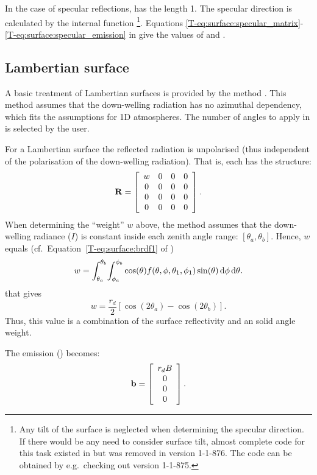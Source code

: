 In the case of specular reflections,  has the length 1.
The specular direction is calculated by the internal function
\footnote{Any tilt of the surface is
  neglected when determining the specular direction. If there would be any need
  to consider surface tilt, almost complete code for this task existed in
   but was removed in version 1-1-876. The
  code can be obtained by e.g.\ checking out version 1-1-875.}. Equations
\ref{T-eq:surface:specular_matrix}-\ref{T-eq:surface:specular_emission}
in \theory give the values of  and
.



\subsection{Lambertian surface}
A basic treatment of Lambertian surfaces is provided by the method
. This method assumes that the down-welling
radiation has no azimuthal dependency, which fits the assumptions for 1D
atmospheres. The number of angles to apply in  is
selected by the user. 

For a Lambertian surface the reflected radiation is unpolarised (thus
independent of the polarisation of the down-welling radiation). That is,
each  has the structure:
\begin{equation}
  \mathbf{R} =
     \left[\begin{array}{cccc}
       w&0&0&0\\
       0&0&0&0\\
       0&0&0&0\\
       0&0&0&0\\
     \end{array}
     \right].
\end{equation}
When determining the ``weight'' $w$ above, the method assumes that the
down-welling radiance ($I$) is constant inside each zenith angle range:
$[\theta_a,\theta_b]$. Hence, $w$ equals (cf.\
Equation~\ref{T-eq:surface:brdf1} of \theory)
\begin{equation}
  \label{eq:surface:brdf2}
  w = \int_{\theta_a}^{\theta_b} \! \int_{\phi_a}^{\phi_b} 
  \cos(\theta) f(\theta,\phi,\theta_1,\phi_1)
  \sin(\theta) \, \mathrm{d}\phi \, \mathrm{d}\theta.
\end{equation}
that gives
\begin{equation}
  w = \frac{r_d}{2}\left[\cos(2\theta_a)-\cos(2\theta_b)\right].
\end{equation}
Thus, this value is a combination of the surface reflectivity and an solid
angle weight.


The emission () becomes:
\begin{equation}
  \label{eq:surface:blambertian} 
  \mathbf{b} =  \left[\begin{array}{c} r_dB \\ 0 \\0\\0 \end{array}\right].
\end{equation}



